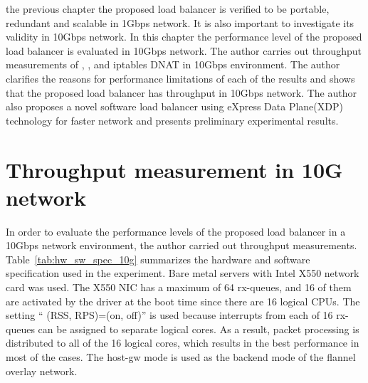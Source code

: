  the previous chapter the proposed load balancer is verified to be portable, redundant and scalable in 1Gbps network.
It is also important to investigate its validity in 10Gbps network.
In this chapter the performance level of the proposed load balancer is evaluated in 10Gbps network.
The author carries out throughput measurements of , , and iptables DNAT in 10Gbps environment.
The author clarifies the reasons for performance limitations of each of the results and shows that the proposed load balancer has  throughput in 10Gbps network.
The author also proposes a novel software load balancer using eXpress Data Plane(XDP) technology for faster network and presents preliminary experimental results.

\section{Throughput measurement in 10G network}

In order to evaluate the performance levels of the proposed load balancer in a 10Gbps network environment, the author carried out throughput measurements.
Table~\ref{tab:hw_sw_spec_10g} summarizes the hardware and software specification used in the experiment.
Bare metal servers with Intel X550 network card was used.
The X550 NIC has a maximum of 64 rx-queues, and 16 of them are activated by the driver at the boot time since there are 16 logical CPUs.
The setting \enquote{ (RSS, RPS)=(on, off)} is used because interrupts from each of 16 rx-queues can be assigned to separate logical cores.
As a result, packet processing is distributed to all of the 16 logical cores, which results in the best performance in most of the cases.
The host-gw mode is used as the backend mode of the flannel overlay network.

